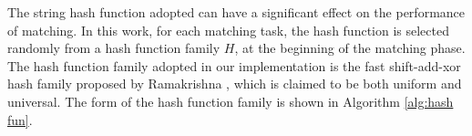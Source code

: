 \documentclass{article}
\begin{document}
The string hash function adopted can have a significant effect on the
performance of matching. In this work, for each matching task, the
hash function is selected randomly from a \textsf{hash function
  family} $H$, at the beginning of the matching phase. The hash
function family adopted in our implementation is the fast
\textsf{shift-add-xor} hash family proposed by Ramakrishna
\cite{Ramakrishna1997}, which is claimed to be both uniform and
universal. The form of the hash function family is shown in Algorithm
\ref{alg:hash fun}.






\end{document}
